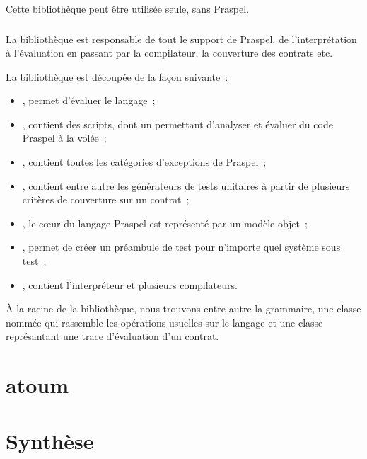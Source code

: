 Cette bibliothèque peut être utilisée seule, sans Praspel.

\subsubsection{}

La bibliothèque  est responsable de tout le support de
Praspel, de l'interprétation à l'évaluation en passant par la compilateur, la
couverture des contrats etc.

La bibliothèque est découpée de la façon suivante~:
%
\begin{itemize}

\item {}, permet d'évaluer le langage~;

\item {}, contient des scripts, dont un  permettant
d'analyser et évaluer du code Praspel à la volée~;

\item {}, contient toutes les catégories d'exceptions de Praspel~;

\item {}, contient entre autre les générateurs de tests unitaires à
partir de plusieurs critères de couverture sur un contrat~;

\item {}, le cœur du langage Praspel est représenté par un modèle
objet~;

\item {}, permet de créer un préambule de test pour n'importe quel
système sous test~;

\item {}, contient l'interpréteur et plusieurs compilateurs.

\end{itemize}

À la racine de la bibliothèque, nous trouvons entre autre la grammaire, une
classe nommée  qui rassemble les
opérations usuelles sur le langage et une classe représantant une trace
d'évaluation d'un contrat.

\subsubsection{}

\subsubsection{}

\section{atoum}

\section{Synthèse}

